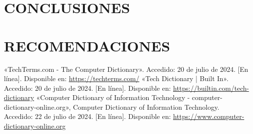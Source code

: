 \section{CONCLUSIONES}

\section{RECOMENDACIONES}

\clearpage
\begin{thebibliography}{X}
     «TechTerms.com - The Computer Dictionary». Accedido: 20 de julio de 2024. [En línea]. Disponible en: \url{https://techterms.com/}
     «Tech Dictionary | Built In». Accedido: 20 de julio de 2024. [En línea]. Disponible en: \url{https://builtin.com/tech-dictionary}
     «Computer Dictionary of Information Technology - computer-dictionary-online.org», Computer Dictionary of Information Technology. Accedido: 22 de julio de 2024. [En línea]. Disponible en: \url{https://www.computer-dictionary-online.org}

\end{thebibliography}
